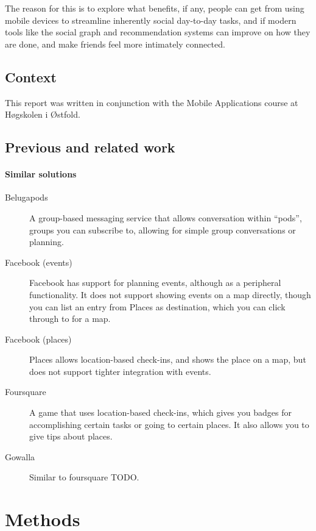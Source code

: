 \documentclass[]{report}
\begin{document}
The reason for this is to explore what benefits, if any, people can get from
using mobile devices to streamline inherently social day-to-day tasks, and if
modern tools like the social graph and recommendation systems can improve on how
they are done, and make friends feel more intimately connected.

\section{Context}

This report was written in conjunction with the Mobile Applications course at
H\o{}gskolen i \O{}stfold\cite{site:mobapp}.

\section{Previous and related work}

\subsubsection{Similar solutions}

\begin{description}
\item[Belugapods] A group-based messaging service that allows conversation
  within ``pods'', groups you can subscribe to, allowing for simple group
  conversations or planning.\cite{site:belugapods}
\item[Facebook (events)] Facebook has support for planning events, although as a
  peripheral functionality. It does not support showing events on a map
  directly, though you can list an entry from Places as destination, which you
  can click through to for a map.\cite{site:facebook}
\item[Facebook (places)] Places allows location-based check-ins, and shows the
  place on a map, but does not support tighter integration with events.\cite{site:facebook}
\item[Foursquare] A game that uses location-based check-ins, which gives you
  badges for accomplishing certain tasks or going to certain places. It also
  allows you to give tips about places.\cite{site:foursquare}
\item[Gowalla] Similar to foursquare TODO.\cite{site:gowalla}
\end{description}



\chapter{Methods}
\end{document}
